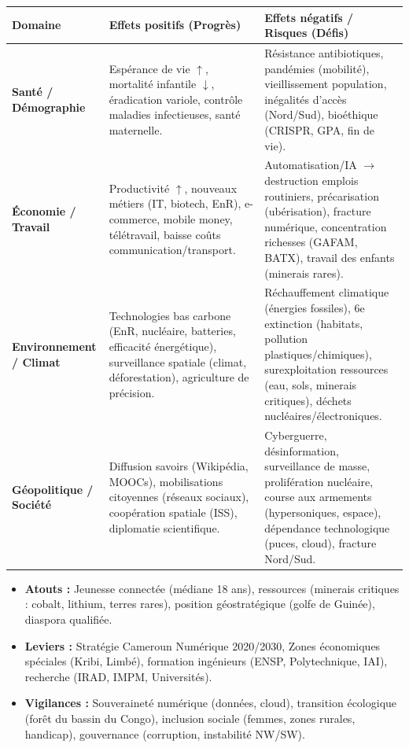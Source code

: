 \documentclass[11pt]{article}
\newcommand{\cle}[1]{{\popxbold\color{popdark}#1}}
\begin{document}
\begin{aretenir}
\begin{center}
\begin{tabularx}{\linewidth}{|>{\bfseries}l|X|X|}\hline
\textbf{Domaine} & \textbf{Effets positifs (Progrès)} & \textbf{Effets négatifs / Risques (Défis)} \\ \hline
\textbf{Santé / Démographie} & Espérance de vie $\uparrow$, mortalité infantile $\downarrow$, éradication variole, contrôle maladies infectieuses, santé maternelle. & Résistance antibiotiques, pandémies (mobilité), vieillissement population, inégalités d'accès (Nord/Sud), bioéthique (CRISPR, GPA, fin de vie). \\ \hline
\textbf{Économie / Travail} & Productivité $\uparrow$, nouveaux métiers (IT, biotech, EnR), e-commerce, mobile money, télétravail, baisse coûts communication/transport. & Automatisation/IA $\rightarrow$ destruction emplois routiniers, précarisation (ubérisation), fracture numérique, concentration richesses (GAFAM, BATX), travail des enfants (minerais rares). \\ \hline
\textbf{Environnement / Climat} & Technologies bas carbone (EnR, nucléaire, batteries, efficacité énergétique), surveillance spatiale (climat, déforestation), agriculture de précision. & Réchauffement climatique (énergies fossiles), 6e extinction (habitats, pollution plastiques/chimiques), surexploitation ressources (eau, sols, minerais critiques), déchets nucléaires/électroniques. \\ \hline
\textbf{Géopolitique / Société} & Diffusion savoirs (Wikipédia, MOOCs), mobilisations citoyennes (réseaux sociaux), coopération spatiale (ISS), diplomatie scientifique. & Cyberguerre, désinformation, surveillance de masse, prolifération nucléaire, course aux armements (hypersoniques, espace), dépendance technologique (puces, cloud), fracture Nord/Sud. \\ \hline
\end{tabularx}
\end{center}
\end{aretenir}

\begin{savaistu}
\begin{itemize}
\item \textbf{Atouts :} Jeunesse connectée (médiane 18 ans), ressources (minerais critiques : cobalt, lithium, terres rares), position géostratégique (golfe de Guinée), diaspora qualifiée.
\item \textbf{Leviers :} Stratégie \cle{Cameroun Numérique 2020/2030}, Zones économiques spéciales (Kribi, Limbé), formation ingénieurs (ENSP, Polytechnique, IAI), recherche (IRAD, IMPM, Universités).
\item \textbf{Vigilances :} Souveraineté numérique (données, cloud), transition écologique (forêt du bassin du Congo), inclusion sociale (femmes, zones rurales, handicap), gouvernance (corruption, instabilité NW/SW).
\end{itemize}
\end{savaistu}
\end{document}
